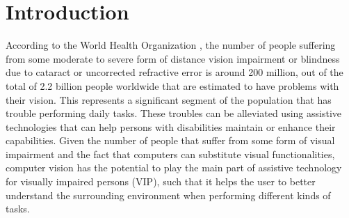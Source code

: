 \section{Introduction}

According to the World Health Organization \cite{worldReportOnVision}, the number of people suffering from some moderate to severe form of distance vision impairment or blindness due to cataract or uncorrected refractive error is around 200 million, out of the total of 2.2 billion people worldwide that are estimated to have problems with their vision. This represents a significant segment of the population that has trouble performing daily tasks. These troubles can be alleviated using assistive technologies that can help persons with disabilities maintain or enhance their capabilities. Given the number of people that suffer from some form of visual impairment and the fact that computers can substitute visual functionalities, computer vision has the potential to play the main part of assistive technology for visually impaired persons (VIP), such that it helps the user to better understand the surrounding environment when performing different kinds of tasks.


